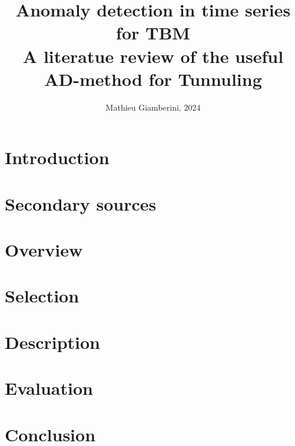 \documentclass{article}
\title{Anomaly detection in time series for TBM \\ \small{A literatue review of the useful AD-method for Tunnuling}}
\author{Mathieu Giamberini, 2024}
\date{}
\begin{document}
    \maketitle
    \begin{abstract}
        
    \end{abstract}
    
    \section*{Introduction}
        
    \section{Secondary sources}
    \section{Overview}

    \section{Selection}

    \section{Description}

    \section{Evaluation}%
    \section*{Conclusion}
\end{document}
